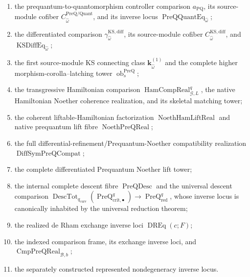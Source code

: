 \begin{definition}
\begin{enumerate}
      $\operatorname{KSRawLiftReal}$ over a selected formal inverse;
\item the prequantum-to-quantomorphism controller comparison
      $a_{\mathrm{PQ}}$, its source-module cofiber
      $C^{\mathrm{PreQ/Quant}}_{\widehat\omega}$, and its inverse locus
      $\operatorname{PreQQuantEq}_{\widehat\omega}$;
\item the differentiated comparison
      $\gamma^{\mathrm{KS,diff}}_{\widehat\omega}$, its source-module cofiber
      $C^{\mathrm{KS,diff}}_{\widehat\omega}$, and
      $\operatorname{KSDiffEq}_{\widehat\omega}$;
\item the first source-module KS connecting class
      $\mathbf k_{\widehat\omega}^{(1)}$ and the complete higher
      morphism-corolla--latching tower $\operatorname{ob}^{\mathrm{PreQ}}_s$;
\item the transgressive Hamiltonian comparison
      $\operatorname{HamCompReal}_{\mathcal G,L}^{q}$, the native Hamiltonian
      Noether coherence realization, and its skeletal matching tower;
\item the coherent liftable-Hamiltonian factorization
      $\operatorname{NoethHamLiftReal}$ and native prequantum lift fibre
      $\operatorname{NoethPreQReal}$;
\item the full differential-refinement/Prequantum-Noether compatibility realization
      $\operatorname{DiffSymPreQCompat}$;
\item the complete differentiated Prequantum Noether lift tower;
\item the internal complete descent fibre $\operatorname{PreQDesc}$ and the
      universal descent comparison
      $\operatorname{DescTot}_{q_{\mathrm{curv}}}
      (\operatorname{PreQ}_{\mathrm{crit},\bullet}^{q})
      \to\operatorname{PreQ}_{\mathrm{red}}^q$, whose inverse locus is
      canonically inhabited by the universal reduction theorem;
\item the realized de Rham exchange inverse loci $\operatorname{DREq}(c;F)$;
\item the indexed comparison frame, its exchange inverse loci, and
      $\operatorname{CmpPreQReal}_{\mathcal B,b}$;
\item the separately constructed represented nondegeneracy inverse locus.
\end{enumerate}
\end{definition}


